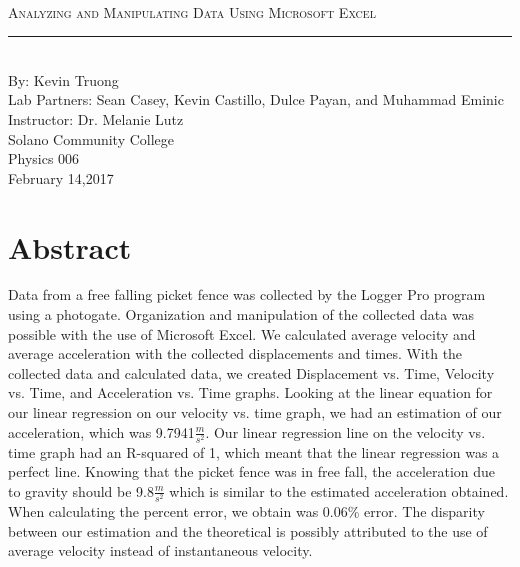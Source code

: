 \documentclass[aps,letterpaper,11pt]{revtex4}
\newcommand{\labno}{3}
\newcommand{\labtitle}{Analyzing and Manipulating Data Using Microsoft Excel}
\newcommand{\authorname}{Kevin Truong}
\newcommand{\professor}{Dr. Melanie Lutz}
\newcommand{\classno}{Physics 006}
\newcommand{\labpartners}{Sean Casey, Kevin Castillo, Dulce Payan, and Muhammad Eminic}
\newcommand{\submitdate}{February 14,2017}
\begin{document}
\begin{titlepage}
\begin{center}
\hspace{-136mm}\boxed{{\Large \textsc{Lab No. \labno}}}\\\vspace{30mm}
{\Large \textsc{\labtitle} \\ \vspace{4pt}}
\rule[13pt]{\textwidth}{1pt}\\ \vspace{150pt}
{\large By: \authorname \\ \vspace{10pt}}
Lab Partners: \labpartners \\
Instructor: \professor \vspace{10pt} \\
Solano Community College\\ \classno \\ \vspace{10pt}
\submitdate
\end{center}
\end{titlepage}

\section{Abstract}

Data from a free falling picket fence was collected by the Logger Pro program using a photogate. Organization and manipulation of the collected data was possible with the use of Microsoft Excel. We calculated average velocity and average acceleration with the collected displacements and times. With the collected data and calculated data, we created Displacement vs. Time, Velocity vs. Time, and Acceleration vs. Time graphs. Looking at the linear equation for our linear regression on our velocity vs. time graph, we had an estimation of our acceleration, which was 9.7941$\frac{m}{s^2}$. Our linear regression line on the velocity vs. time graph had an R-squared of 1, which meant that the linear regression was a perfect line. Knowing that the picket fence was in free fall, the acceleration due to gravity should be 9.8$\frac{m}{s^2}$ which is similar to the estimated acceleration obtained. When calculating the percent error, we obtain was 0.06\% error. The disparity between our estimation and the theoretical is possibly attributed to the use of average velocity instead of instantaneous velocity.  

\newpage  
\end{document}
